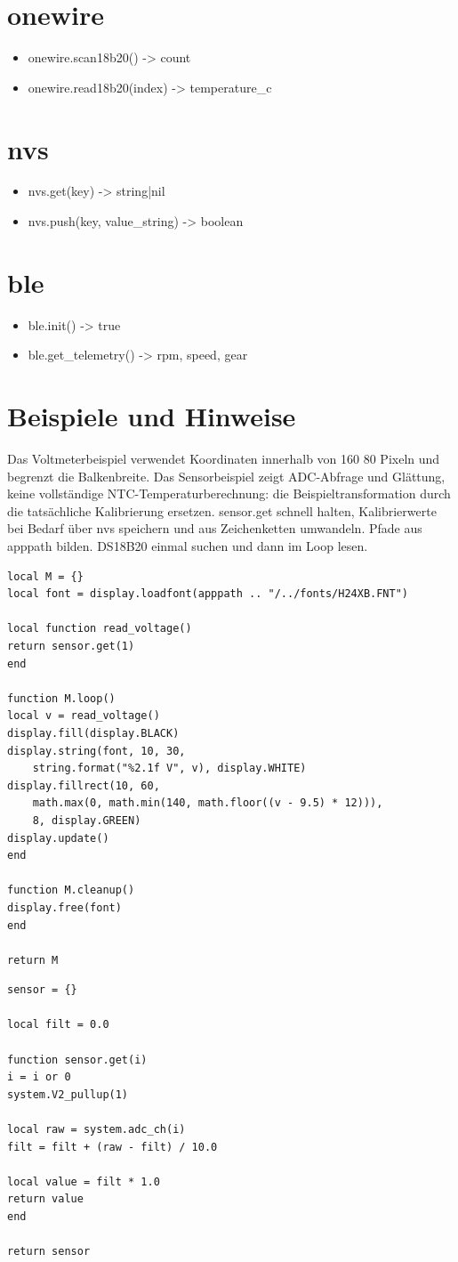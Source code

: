 \section{onewire}
\begin{itemize}
\item onewire.scan18b20() -> count
\item onewire.read18b20(index) -> temperature\_c
\end{itemize}
\section{nvs}
\begin{itemize}
\item nvs.get(key) -> string|nil
\item nvs.push(key, value\_string) -> boolean
\end{itemize}
\section{ble}
\begin{itemize}
\item ble.init() -> true
\item ble.get\_telemetry() -> rpm, speed, gear
\end{itemize}
\section{Beispiele und Hinweise}
Das Voltmeterbeispiel verwendet Koordinaten innerhalb von 160\,\texttimes\,80 Pixeln und begrenzt die Balkenbreite. Das Sensorbeispiel zeigt ADC-Abfrage und Glättung, keine vollständige NTC-Temperaturberechnung: die Beispieltransformation durch die tatsächliche Kalibrierung ersetzen. sensor.get schnell halten, Kalibrierwerte bei Bedarf über nvs speichern und aus Zeichenketten umwandeln. Pfade aus apppath bilden. DS18B20 einmal suchen und dann im Loop lesen.
\begin{verbatim}
local M = {}
local font = display.loadfont(apppath .. "/../fonts/H24XB.FNT")

local function read_voltage()
return sensor.get(1)
end

function M.loop()
local v = read_voltage()
display.fill(display.BLACK)
display.string(font, 10, 30,
    string.format("%2.1f V", v), display.WHITE)
display.fillrect(10, 60,
    math.max(0, math.min(140, math.floor((v - 9.5) * 12))),
    8, display.GREEN)
display.update()
end

function M.cleanup()
display.free(font)
end

return M
\end{verbatim}
\begin{verbatim}
sensor = {}

local filt = 0.0

function sensor.get(i)
i = i or 0
system.V2_pullup(1)

local raw = system.adc_ch(i)
filt = filt + (raw - filt) / 10.0

local value = filt * 1.0
return value
end

return sensor
\end{verbatim}
